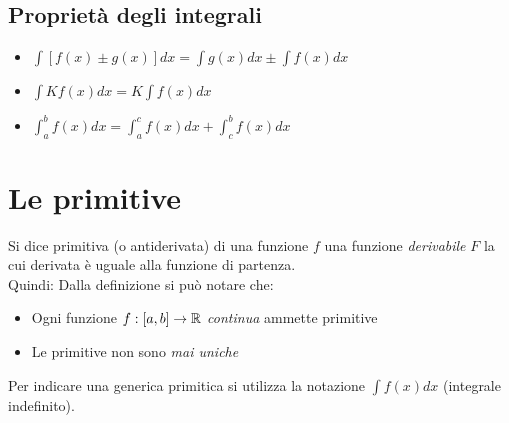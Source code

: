 \subsection{Proprietà degli integrali}
\begin{itemize}
	\item $\int[f(x) \pm g(x)] dx = \int g(x) dx \pm \int f(x) dx$
	\item $\int K f(x) dx = K\int f(x) dx$
	\item $\int_{a}^{b} f(x) dx = \int_{a}^{c} f(x) dx + \int_{c}^{b} f(x) dx$
\end{itemize}

\section{Le primitive}

Si dice primitiva (o antiderivata) di una funzione $f$ una funzione \emph{derivabile} $F$ la cui derivata è uguale alla funzione di partenza.
\\Quindi:
Dalla definizione si può notare che:
\begin{itemize}
	\item Ogni funzione $f:[a,b] \to \mathbb{R}$ \emph{continua} ammette primitive
	\item Le primitive non sono \emph{mai uniche}
\end{itemize}
Per indicare una generica primitica si utilizza la notazione $\int f(x) dx$ (integrale indefinito).

